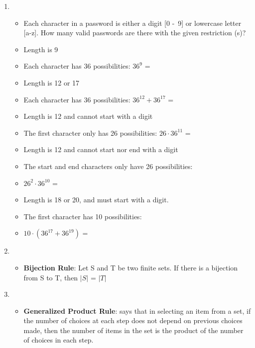 \documentclass[12pt,a4paper]{article}
\begin{document}
\clearpage
\begin{center}
  \large\textsc{}
\end{center}
\begin{enumerate}
  \item {}
  \begin{itemize}
    \item Each character in a password is either a digit [0 -\ 9] or lowercase letter [a-z]. How many valid passwords are there with the given restriction (s)?
    \item Length is 9 
    \item[] Each character has 36 possibilities: \(36^9\) = 
    \item Length is 12 or 17
    \item[] Each character has 36 possibilities: \(36^{12} + 36^{17}\) = 
    \item Length is 12 and cannot start with a digit
    \item[] The first character only has 26 possibilities: \(26 \cdot 36^{11}\) = 
    \item Length is 12 and cannot start nor end with a digit
    \item[] The start and end characters only have 26 possibilities: 
    \item[] \(26^{2} \cdot 36^{10}\) =  
    \item Length is 18 or 20, and must start with a digit.
    \item[] The first character has 10 possibilities: 
    \item[] \(10 \cdot (36^{17} + 36^{19})\) =    
  \end{itemize}
  \item {}
  \begin{itemize}
    \item \textbf{Bijection Rule}: Let S and T be two finite sets. If there is a bijection from S to T, then \(\vert S \vert \) = \(\vert T \vert \)
  \end{itemize}
  \item {}
  \begin{itemize}
    \item \textbf{Generalized Product Rule}: says that in selecting an item from a set, if the number of choices at each step does not depend on previous choices made, then the number of items in the set is the product of the number of choices in each step.

\end{itemize}
\end{enumerate}
\end{document}
